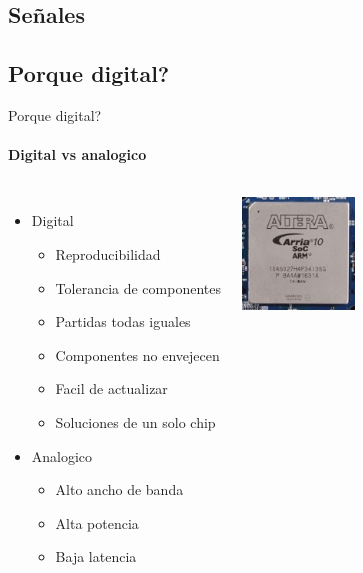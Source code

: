 \documentclass{beamer}
\begin{document}
  \begin{darkframes}
    \section{Señales}
    \subsection{Porque digital?}
    \begin{frame}{Porque digital?}
      \framesubtitle{Digital vs analogico}
      \begin{columns}[onlytextwidth]
            \begin{itemize}
               \item{Digital}
                  \begin{itemize}
                     \item{Reproducibilidad}
                     \item{Tolerancia de componentes}
                     \item{Partidas todas iguales}
                     \item{Componentes no envejecen}
                     \item{Facil de actualizar}
                     \item{Soluciones de un solo chip}
                  \end{itemize}
               \item{Analogico}
                  \begin{itemize}
                     \item{Alto ancho de banda}
                     \item{Alta potencia}
                     \item{Baja latencia}
                  \end{itemize}
            \end{itemize}
               \includegraphics[width=30mm]{1_clase/fpga}
               \newline


\end{columns}
\end{frame}
\end{darkframes}
\end{document}
